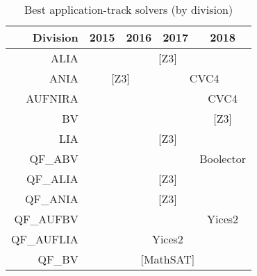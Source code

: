 \newcommand{\nc}[1]{{[}#1{]}}
\begin{table}
  \caption{Best application-track solvers (by division)}
  \label{tab:winners-application}
  \centering
  \begin{tabular}{|rcccc|}
    \hline
    Division                         & 2015                          & 2016  & 2017      & 2018      \\ \hline
    \multicolumn{1}{|r|}{ALIA}       & \multicolumn{4}{c|}{\nc{Z3}}                    \\ \cline{2-5} 
    \multicolumn{1}{|r|}{ANIA}       & \multicolumn{2}{c|}{\nc{Z3}}                                   & \multicolumn{2}{c|}{CVC4}                                      \\ \cline{2-5} 
    AUFNIRA                          &                               &                                 & \multicolumn{1}{l|}{}         & \multicolumn{1}{c|}{CVC4}      \\ \cline{5-5} 
    BV                               &                               &                                 & \multicolumn{1}{l|}{}         & \multicolumn{1}{c|}{\nc{Z3}}  \\ \cline{2-5} 
    \multicolumn{1}{|r|}{LIA}        & \multicolumn{4}{c|}{\nc{Z3}}                                                                                                    \\ \cline{2-5} 
    QF\_ABV                          & \multicolumn{1}{l}{}          &                                 & \multicolumn{1}{l|}{}         & \multicolumn{1}{c|}{Boolector} \\ \cline{2-5} 
    \multicolumn{1}{|r|}{QF\_ALIA}   & \multicolumn{4}{c|}{\nc{Z3}}                                                                                                    \\ \cline{2-5} 
    \multicolumn{1}{|r|}{QF\_ANIA}   & \multicolumn{4}{c|}{\nc{Z3}}                                                                                                    \\ \cline{2-5} 
    QF\_AUFBV                        & \multicolumn{1}{l}{}          &                                 & \multicolumn{1}{l|}{}         & \multicolumn{1}{c|}{Yices2}    \\ \cline{2-5} 
    \multicolumn{1}{|r|}{QF\_AUFLIA} & \multicolumn{4}{c|}{Yices2}                                                                                                      \\ \cline{2-5} 
    \multicolumn{1}{|r|}{QF\_BV}     & \multicolumn{4}{c|}{\nc{MathSAT}}                                                                                               \\ \cline{2-5} 

\end{tabular}
\end{table}
